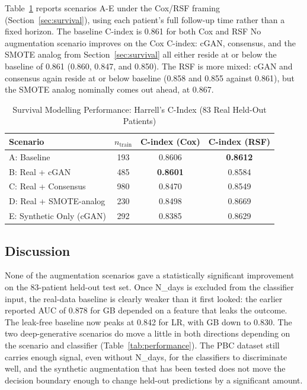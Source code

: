 Table~\ref{tab:survival} reports scenarios A-E under the Cox/RSF framing (Section~\ref{sec:survival}), using each patient's full follow-up time rather than a fixed horizon. The baseline C-index is 0.861 for both Cox and RSF No augmentation scenario improves on the Cox C-index: cGAN, consensus, and the SMOTE analog from Section~\ref{sec:survival} all either reside at or below the baseline of 0.861 (0.860, 0.847, and 0.850). The RSF is more mixed: cGAN and consensus again reside at or below baseline (0.858 and 0.855 against 0.861), but the SMOTE analog nominally comes out ahead, at 0.867. 

\begin{table}[!tb]
  \centering
  \caption{Survival Modelling Performance: Harrell's C-Index (83 Real Held-Out Patients)}
  \label{tab:survival}
  \begin{tabular}{lccc}
    \toprule
    Scenario & $n_{\text{train}}$ & C-index (Cox) & C-index (RSF) \\
    \midrule
    A: Baseline          & 193 & 0.8606 & \textbf{0.8612} \\
    B: Real + cGAN      & 485 & \textbf{0.8601} & 0.8584 \\
    C: Real + Consensus  & 980 & 0.8470 & 0.8549 \\
    D: Real + SMOTE-analog & 230 & 0.8498 & 0.8669 \\
    E: Synthetic Only (cGAN) & 292 & 0.8385 & 0.8629 \\
    \bottomrule
  \end{tabular}
\end{table}

\subsection{Discussion}

None of the augmentation scenarios gave a statistically significant improvement on the 83-patient held-out test set. Once N\_days is excluded from the classifier input, the real-data baseline is clearly weaker than it first looked: the earlier reported AUC of 0.878 for GB depended on a feature that leaks the outcome. The leak-free baseline now peaks at 0.842 for LR, with GB down to 0.830. The two deep-generative scenarios do move a little in both directions depending on the scenario and classifier (Table~\ref{tab:performance}).  The PBC dataset still carries enough signal, even without N\_days, for the classifiers to discriminate well, and the synthetic augmentation that has been tested does not move the decision boundary enough to change held-out predictions by a significant amount.

